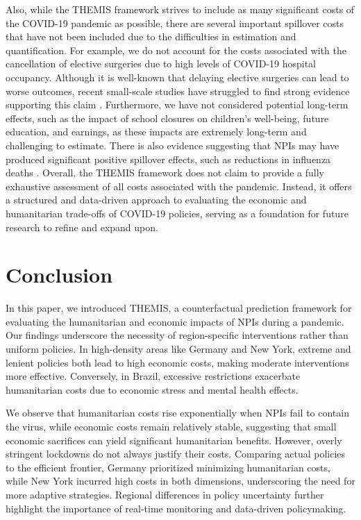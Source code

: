 \documentclass[msom,blindrev]{informs3} %
\begin{document}
Also, while the THEMIS framework strives to include as many significant costs of the COVID-19 pandemic as possible, there are several important spillover costs that have not been included due to the difficulties in estimation and quantification. For example, we do not account for the costs associated with the cancellation of elective surgeries due to high levels of COVID-19 hospital occupancy. Although it is well-known that delaying elective surgeries can lead to worse outcomes, recent small-scale studies have struggled to find strong evidence supporting this claim . Furthermore, we have not considered potential long-term effects, such as the impact of school closures on children's well-being, future education, and earnings, as these impacts are extremely long-term and challenging to estimate. There is also evidence suggesting that NPIs may have produced significant positive spillover effects, such as reductions in influenza deaths . Overall, the THEMIS framework does not claim to provide a fully exhaustive assessment of all costs associated with the pandemic. Instead, it offers a structured and data-driven approach to evaluating the economic and humanitarian trade-offs of COVID-19 policies, serving as a foundation for future research to refine and expand upon.
\section{Conclusion}
\label{sec:conclusion}
In this paper, we introduced THEMIS, a counterfactual prediction framework for evaluating the humanitarian and economic impacts of NPIs during a pandemic. Our findings underscore the necessity of region-specific interventions rather than uniform policies. In high-density areas like Germany and New York, extreme and lenient policies both lead to high economic costs, making moderate interventions more effective. Conversely, in Brazil, excessive restrictions exacerbate humanitarian costs due to economic stress and mental health effects.

We observe that humanitarian costs rise exponentially when NPIs fail to contain the virus, while economic costs remain relatively stable, suggesting that small economic sacrifices can yield significant humanitarian benefits. However, overly stringent lockdowns do not always justify their costs. Comparing actual policies to the efficient frontier, Germany prioritized minimizing humanitarian costs, while New York incurred high costs in both dimensions, underscoring the need for more adaptive strategies. Regional differences in policy uncertainty further highlight the importance of real-time monitoring and data-driven policymaking.
\end{document}
